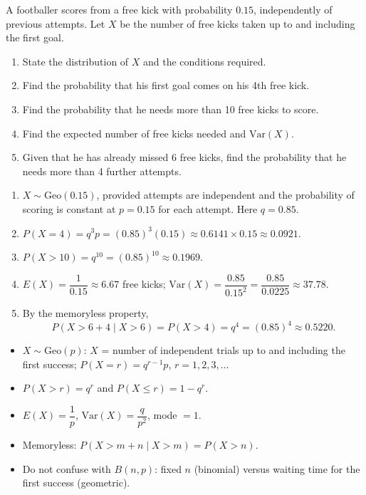 \documentclass[11pt]{article}
\newcounter{popsec}
\newcounter{popsub}
\newcommand{\courssub}[1]{%
  \stepcounter{popsub}%
  \par\vspace{9pt}\noindent{\popxbold\fontsize{11.5}{13}\selectfont\color{popink}{\color{poporange}\thepopsec.\thepopsub}\hspace{6pt}#1}\par\nopagebreak\vspace{4pt}
}
\begin{document}
\begin{exoresolu}
A footballer scores from a free kick with probability $0.15$, independently of previous attempts. Let $X$ be the number of free kicks taken up to and including the first goal.
\begin{enumerate}
\item State the distribution of $X$ and the conditions required.
\item Find the probability that his first goal comes on his 4th free kick.
\item Find the probability that he needs more than 10 free kicks to score.
\item Find the expected number of free kicks needed and $\mathrm{Var}(X)$.
\item Given that he has already missed 6 free kicks, find the probability that he needs more than 4 further attempts.
\end{enumerate}
\tcblower
\begin{enumerate}
\item $X\sim\mathrm{Geo}(0.15)$, provided attempts are independent and the probability of scoring is constant at $p=0.15$ for each attempt. Here $q=0.85$.
\item $P(X=4)=q^{3}p=(0.85)^{3}(0.15)\approx 0.6141\times 0.15\approx 0.0921$.
\item $P(X>10)=q^{10}=(0.85)^{10}\approx 0.1969$.
\item $E(X)=\dfrac{1}{0.15}\approx 6.67$ free kicks; $\mathrm{Var}(X)=\dfrac{0.85}{0.15^{2}}=\dfrac{0.85}{0.0225}\approx 37.78$.
\item By the memoryless property,
\[ P(X>6+4\mid X>6)=P(X>4)=q^{4}=(0.85)^{4}\approx 0.5220. \]
\end{enumerate}
\end{exoresolu}

\courssub{Summary and Practice}

\begin{aretenir}
\begin{itemize}
\item $X\sim\mathrm{Geo}(p)$: $X$ = number of independent trials up to and including the first success; $P(X=r)=q^{r-1}p$, $r=1,2,3,\dots$
\item $P(X>r)=q^{r}$ and $P(X\le r)=1-q^{r}$.
\item $E(X)=\dfrac{1}{p}$, $\mathrm{Var}(X)=\dfrac{q}{p^{2}}$, mode $=1$.
\item Memoryless: $P(X>m+n\mid X>m)=P(X>n)$.
\item Do not confuse with $B(n,p)$: fixed $n$ (binomial) versus waiting time for the first success (geometric).
\end{itemize}
\end{aretenir}
\end{document}
